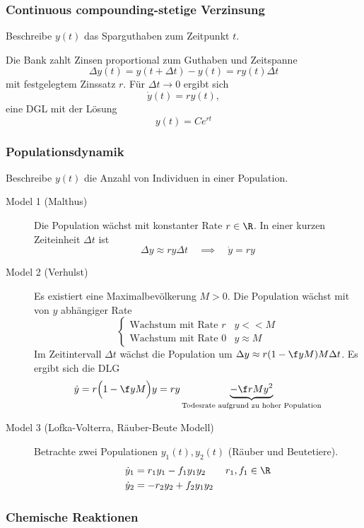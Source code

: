 \documentclass[
]{mycourse}
\begin{document}
\subsubsection{Continuous compounding-stetige Verzinsung}

Beschreibe $y(t)$ das Sparguthaben zum Zeitpunkt $t$.


Die Bank zahlt Zinsen proportional zum Guthaben und Zeitspanne
\[
	\Delta y(t) = y(t + \Delta t) - y(t) = r y(t) \Delta t
\]
mit festgelegtem Zinssatz $r$.
Für $\Delta t \to 0$ ergibt sich
\[
	\dot y (t) = ry(t),
\]
eine DGL mit der Lösung
\[
	y(t) = Ce^{rt}
\]

\subsubsection{Populationsdynamik}

Beschreibe $y(t)$ die Anzahl von Individuen in einer Population.

\begin{description}
	\item[Model 1 (Malthus)]
		Die Population wächst mit konstanter Rate $r \in \R$.
		In einer kurzen Zeiteinheit $\Delta t$ ist
		\[
			\Delta y \approx ry \Delta t
			\quad \implies \quad
			\dot y = r y
		\]
	\item[Model 2 (Verhulst)]
		Es existiert eine Maximalbevölkerung $M > 0$.
		Die Population wächst mit von $y$ abhängiger Rate
		\[
			\begin{cases}
				\text{Wachstum mit Rate $r$} & y << M \\
				\text{Wachstum mit Rate $0$} & y \approx M
			\end{cases}
		\]
		Im Zeitintervall $\Delta t$ wächst die Population um $\Delta y \approx r(1-\f yM) M \Delta t$.
		Es ergibt sich die DLG
		\[
			\dot y = r \Big(1 - \f yM\Big) y = ry \underbrace{- \f rM y^2}_{\text{Todesrate aufgrund zu hoher Population}}
		\]
	\item[Model 3 (Lofka-Volterra, Räuber-Beute Modell)]
		Betrachte zwei Populationen $y_1(t), y_2(t)$ (Räuber und Beutetiere).
		\begin{align*}
			\dot y_1 &= r_1 y_1 - f_1y_1y_2
			\qquad r_1,f_1 \in \R \\
			\dot y_2 &= -r_2 y_2 + f_2 y_1y_2
		\end{align*}
\end{description}


\subsubsection{Chemische Reaktionen}
\end{document}
